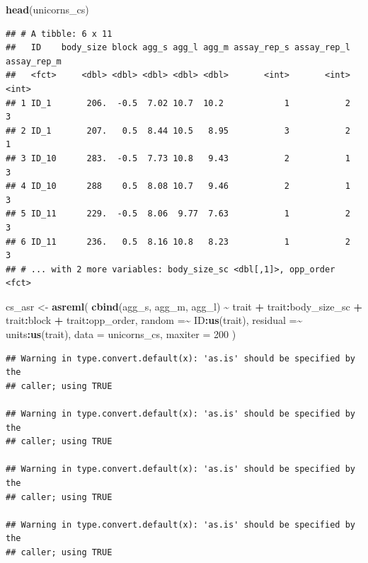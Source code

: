 \documentclass[
  12pt,
]{book}
\newenvironment{Shaded}{\begin{snugshade}}{\end{snugshade}}
\newcommand{\DataTypeTok}[1]{\textcolor[rgb]{0.13,0.29,0.53}{#1}}
\newcommand{\DecValTok}[1]{\textcolor[rgb]{0.00,0.00,0.81}{#1}}
\newcommand{\KeywordTok}[1]{\textcolor[rgb]{0.13,0.29,0.53}{\textbf{#1}}}
\newcommand{\NormalTok}[1]{#1}
\newcommand{\OperatorTok}[1]{\textcolor[rgb]{0.81,0.36,0.00}{\textbf{#1}}}
\newcommand{\StringTok}[1]{\textcolor[rgb]{0.31,0.60,0.02}{#1}}
\begin{document}
\begin{Shaded}
\begin{Highlighting}[]
\KeywordTok{head}\NormalTok{(unicorns\_cs)}
\end{Highlighting}
\end{Shaded}

\begin{verbatim}
## # A tibble: 6 x 11
##   ID    body_size block agg_s agg_l agg_m assay_rep_s assay_rep_l assay_rep_m
##   <fct>     <dbl> <dbl> <dbl> <dbl> <dbl>       <int>       <int>       <int>
## 1 ID_1       206.  -0.5  7.02 10.7  10.2            1           2           3
## 2 ID_1       207.   0.5  8.44 10.5   8.95           3           2           1
## 3 ID_10      283.  -0.5  7.73 10.8   9.43           2           1           3
## 4 ID_10      288    0.5  8.08 10.7   9.46           2           1           3
## 5 ID_11      229.  -0.5  8.06  9.77  7.63           1           2           3
## 6 ID_11      236.   0.5  8.16 10.8   8.23           1           2           3
## # ... with 2 more variables: body_size_sc <dbl[,1]>, opp_order <fct>
\end{verbatim}

\begin{Shaded}
\begin{Highlighting}[]
\NormalTok{cs\_asr \textless{}{-}}\StringTok{ }\KeywordTok{asreml}\NormalTok{(}
  \KeywordTok{cbind}\NormalTok{(agg\_s, agg\_m, agg\_l) }\OperatorTok{\textasciitilde{}}\StringTok{ }\NormalTok{trait }\OperatorTok{+}\StringTok{ }\NormalTok{trait}\OperatorTok{:}\NormalTok{body\_size\_sc }\OperatorTok{+}
\StringTok{    }\NormalTok{trait}\OperatorTok{:}\NormalTok{block }\OperatorTok{+}
\StringTok{    }\NormalTok{trait}\OperatorTok{:}\NormalTok{opp\_order,}
  \DataTypeTok{random =}\OperatorTok{\textasciitilde{}}\StringTok{ }\NormalTok{ID}\OperatorTok{:}\KeywordTok{us}\NormalTok{(trait),}
  \DataTypeTok{residual =}\OperatorTok{\textasciitilde{}}\StringTok{ }\NormalTok{units}\OperatorTok{:}\KeywordTok{us}\NormalTok{(trait),}
  \DataTypeTok{data =}\NormalTok{ unicorns\_cs,}
  \DataTypeTok{maxiter =} \DecValTok{200}
\NormalTok{)}
\end{Highlighting}
\end{Shaded}

\begin{verbatim}
## Warning in type.convert.default(x): 'as.is' should be specified by the
## caller; using TRUE

## Warning in type.convert.default(x): 'as.is' should be specified by the
## caller; using TRUE

## Warning in type.convert.default(x): 'as.is' should be specified by the
## caller; using TRUE

## Warning in type.convert.default(x): 'as.is' should be specified by the
## caller; using TRUE
\end{verbatim}
\end{document}
